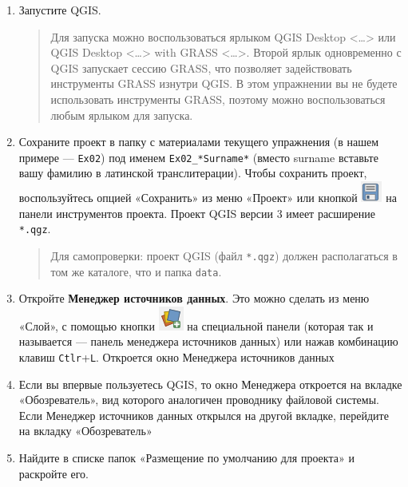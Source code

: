 \documentclass[
  12pt,
]{book}
\begin{document}
\begin{enumerate}
\def\labelenumi{\arabic{enumi}.}
\item
  Запустите QGIS.

  \begin{quote}
  Для запуска можно воспользоваться ярлыком QGIS Desktop \textless\ldots\textgreater{} или QGIS Desktop \textless\ldots\textgreater{} with GRASS \textless\ldots\textgreater. Второй ярлык одновременно с QGIS запускает сессию GRASS, что позволяет задействовать инструменты GRASS изнутри QGIS. В этом упражнении вы не будете использовать инструменты GRASS, поэтому можно воспользоваться любым ярлыком для запуска.
  \end{quote}
\item
  Сохраните проект в папку с материалами текущего упражнения (в нашем примере --- \texttt{Ex02}) под именем \texttt{Ex02\_*Surname*} (вместо surname вставьте вашу фамилию в латинской транслитерации). Чтобы сохранить проект, воспользуйтесь опцией «Сохранить» из меню «Проект» или кнопкой \includegraphics{images/Ex01_WorldMap/save.png} на панели инструментов проекта. Проект QGIS версии 3 имеет расширение \texttt{*.qgz}.

  \begin{quote}
  Для самопроверки: проект QGIS (файл \texttt{*.qgz}) должен располагаться в том же каталоге, что и папка \texttt{data}.
  \end{quote}
\item
  Откройте \textbf{Менеджер источников данных}. Это можно сделать из меню «Слой», с помощью кнопки \includegraphics{images/Ex01_WorldMap/dataSourceManagerButton.png} на специальной панели (которая так и называется --- панель менеджера источников данных) или нажав комбинацию клавиш \texttt{Ctlr}+\texttt{L}. Откроется окно Менеджера источников данных
\item
  Если вы впервые пользуетесь QGIS, то окно Менеджера откроется на вкладке «Обозреватель», вид которого аналогичен проводнику файловой системы. Если Менеджер источников данных открылся на другой вкладке, перейдите на вкладку «Обозреватель»
\item
  Найдите в списке папок «Размещение по умолчанию для проекта» и раскройте его.
\end{enumerate}
\end{document}
